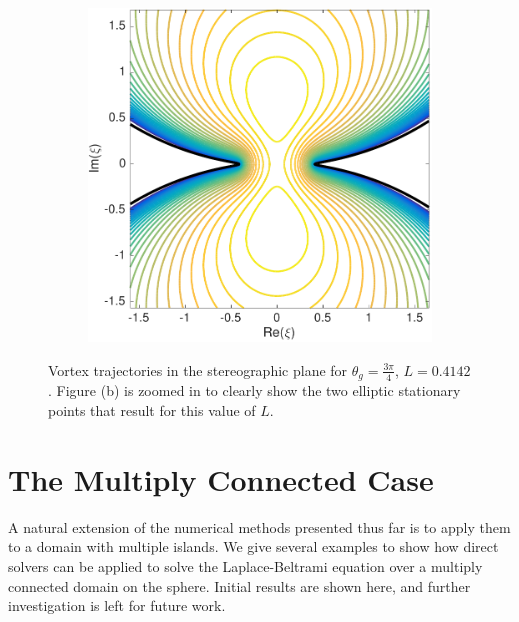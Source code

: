 \documentclass{sfuthesis}
\begin{document}
\begin{figure}[h]
\begin{subfigure}[b]{0.4\textwidth}
       		\includegraphics[width=\textwidth]{Ex6-8LongIslandZoom}
     		\caption{}
   	\end{subfigure}\hspace{0.3cm}
    	\caption{Vortex trajectories in the stereographic plane for $\theta_g=\frac{3\pi}{4}$, $L=0.4142$.  Figure (b) is zoomed in to clearly show the two elliptic stationary points that result for this value of $L$. }
	\label{fig: Ex6-8LongIslandStereo}
 \end{figure}

\chapter{The Multiply Connected Case}
\label{seven}
A natural extension of the numerical methods presented thus far is to apply them to a domain with multiple islands. We give several examples to show how direct solvers can be applied to solve the Laplace-Beltrami equation over a multiply connected domain on the sphere. Initial results are shown here, and further investigation is left for future work.  
\end{document}
